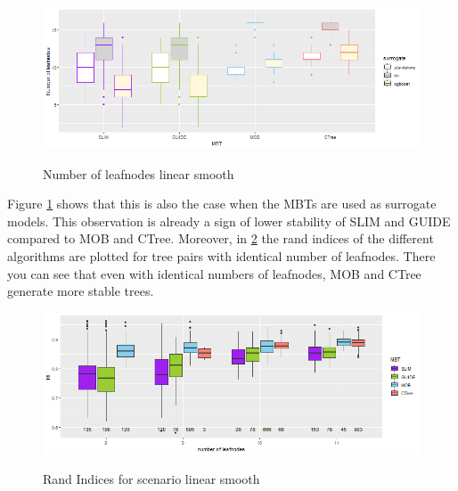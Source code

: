 \begin{figure} 
\caption{Number of leafnodes linear smooth}
    \includegraphics[width=16cm]{Figures/simulations/batchtools/basic_scenarios/linear_smooth/ls_1000_int.png}
    \label{fig:ls_1000_int}
\end{figure} 

Figure \ref{fig:ls_1000_int} shows that this is also the case when the MBTs are used as surrogate models. 
This observation is already a sign of lower stability of SLIM and GUIDE compared to MOB and CTree. Moreover, in \ref{fig:ls_1000_standalone_sta} the rand indices of the different algorithms are plotted for tree pairs with identical number of leafnodes. There you can see that even with identical numbers of leafnodes, MOB and CTree generate more stable trees.


\begin{figure}
\caption{Rand Indices for scenario linear smooth}
    \centering
    \includegraphics[width=16cm]{Figures/simulations/batchtools/basic_scenarios/linear_smooth/ls_1000_standalone_sta.png}
    \label{fig:ls_1000_standalone_sta}
\end{figure}

